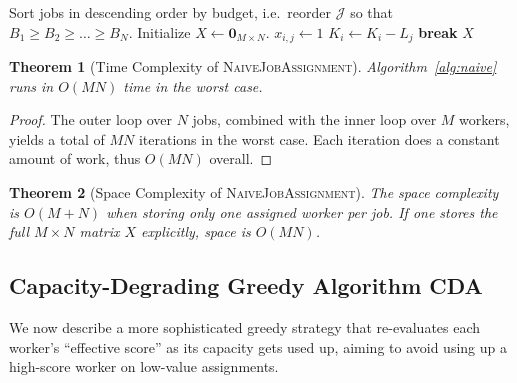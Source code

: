 \documentclass{article}
\newtheorem{theorem}{Theorem}
\begin{document}
\begin{algorithm}[H]
\caption{\textsc{NaiveJobAssignment}}
\label{alg:naive}
\begin{algorithmic}[1]

\State Sort jobs in descending order by budget, i.e.\ reorder $\mathcal{J}$ so that $B_1 \ge B_2 \ge \ldots \ge B_N$.
\State Initialize $X \gets \mathbf{0}_{M\times N}$.
            \State $x_{i,j} \gets 1$ 
            \State $K_i \gets K_i - L_j$ 
            \State \textbf{break}
        \EndIf
    \EndFor
\EndFor
\State \Return $X$
\end{algorithmic}
\end{algorithm}

\begin{theorem}[Time Complexity of \textsc{NaiveJobAssignment}]
\label{thm:naive-time}
Algorithm~\ref{alg:naive} runs in $O(MN)$ time in the worst case.
\end{theorem}
\begin{proof}
The outer loop over $N$ jobs, combined with the inner loop over $M$ workers, yields a total of $MN$ iterations in the worst case. Each iteration does a constant amount of work, thus $O(MN)$ overall.
\end{proof}

\begin{theorem}[Space Complexity of \textsc{NaiveJobAssignment}]
The space complexity is $O(M + N)$ when storing only one assigned worker per job. If one stores the full $M\times N$ matrix $X$ explicitly, space is $O(MN)$.
\end{theorem}

\subsection{Capacity-Degrading Greedy Algorithm \textsc{CDA}}

We now describe a more sophisticated greedy strategy that re-evaluates each worker's ``effective score'' as its capacity gets used up, aiming to avoid using up a high-score worker on low-value assignments.
\end{document}
